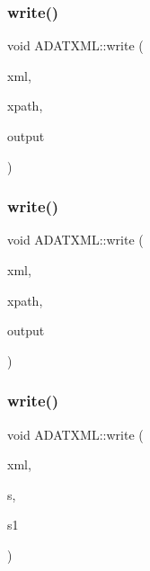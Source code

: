 \mbox{\label{group__io_gaddbbc6b8d1fa2d88b2b7d0ecd3e36884}} 
\subsubsection{\texorpdfstring{write()}{write()}\hspace{0.1cm}{\footnotesize\ttfamily [37/58]}}
{\footnotesize\ttfamily void A\+D\+A\+T\+X\+M\+L\+::write (\begin{DoxyParamCaption}\item[{\mbox{\hyperlink{classADATXML_1_1XMLWriter}{X\+M\+L\+Writer}} \&}]{xml,  }\item[{const std\+::string \&}]{xpath,  }\item[{const std\+::vector$<$ unsigned long int $>$ \&}]{output }\end{DoxyParamCaption})}

\mbox{\label{group__io_ga21089f03811e37a0d78c969c6a611f59}} 
\subsubsection{\texorpdfstring{write()}{write()}\hspace{0.1cm}{\footnotesize\ttfamily [38/58]}}
{\footnotesize\ttfamily void A\+D\+A\+T\+X\+M\+L\+::write (\begin{DoxyParamCaption}\item[{\mbox{\hyperlink{classADATXML_1_1XMLWriter}{X\+M\+L\+Writer}} \&}]{xml,  }\item[{const std\+::string \&}]{xpath,  }\item[{const std\+::vector$<$ float $>$ \&}]{output }\end{DoxyParamCaption})}

\mbox{\label{group__io_gab54b00e1a7cbc507061351d54d6de9fe}} 
\subsubsection{\texorpdfstring{write()}{write()}\hspace{0.1cm}{\footnotesize\ttfamily [39/58]}}
{\footnotesize\ttfamily void A\+D\+A\+T\+X\+M\+L\+::write (\begin{DoxyParamCaption}\item[{\mbox{\hyperlink{classADATXML_1_1XMLWriter}{X\+M\+L\+Writer}} \&}]{xml,  }\item[{const std\+::string \&}]{s,  }\item[{const std\+::vector$<$ double $>$ \&}]{s1 }\end{DoxyParamCaption})}

